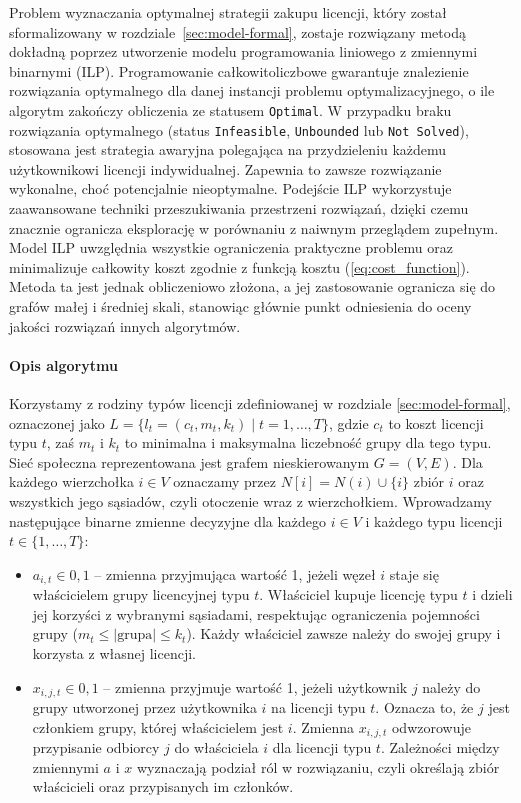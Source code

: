 Problem wyznaczania optymalnej strategii zakupu licencji, który został sformalizowany w rozdziale~\ref{sec:model-formal}, zostaje rozwiązany metodą dokładną poprzez utworzenie modelu programowania liniowego z zmiennymi binarnymi (ILP).
Programowanie całkowitoliczbowe gwarantuje znalezienie rozwiązania optymalnego dla danej instancji problemu optymalizacyjnego, o ile algorytm zakończy obliczenia ze statusem \texttt{Optimal}.
W przypadku braku rozwiązania optymalnego (status \texttt{Infeasible}, \texttt{Unbounded} lub \texttt{Not Solved}), stosowana jest strategia awaryjna polegająca na przydzieleniu każdemu użytkownikowi licencji indywidualnej. Zapewnia to zawsze rozwiązanie wykonalne, choć potencjalnie nieoptymalne.
Podejście ILP wykorzystuje zaawansowane techniki przeszukiwania przestrzeni rozwiązań, dzięki czemu znacznie ogranicza eksplorację w porównaniu z naiwnym przeglądem zupełnym.
Model ILP uwzględnia wszystkie ograniczenia praktyczne problemu oraz minimalizuje całkowity koszt zgodnie z funkcją kosztu (\ref{eq:cost_function}).
Metoda ta jest jednak obliczeniowo złożona, a jej zastosowanie ogranicza się do grafów małej i średniej skali, stanowiąc głównie punkt odniesienia do oceny jakości rozwiązań innych algorytmów.

\paragraph{Opis algorytmu}
Korzystamy z rodziny typów licencji zdefiniowanej w rozdziale \ref{sec:model-formal}, oznaczonej jako $L = \{{l_t = (c_t,m_t,k_t) \mid t = 1,\dots,T}\}$, gdzie $c_t$ to koszt licencji typu $t$, zaś $m_t$ i $k_t$ to minimalna i maksymalna liczebność grupy dla tego typu. Sieć społeczna reprezentowana jest grafem nieskierowanym $G = (V,E)$. Dla każdego wierzchołka $i \in V$ oznaczamy przez $N[i] = N(i) \cup \{i\}$ zbiór $i$ oraz wszystkich jego sąsiadów, czyli otoczenie wraz z wierzchołkiem. Wprowadzamy następujące binarne zmienne decyzyjne dla każdego $i \in V$ i każdego typu licencji $t \in \{1,\dots,T\}$:
\begin{itemize}\setlength{\itemsep}{1ex}
\item $a_{i,t} \in {0,1}$ -- zmienna przyjmująca wartość 1, jeżeli węzeł $i$ staje się właścicielem grupy licencyjnej typu $t$. Właściciel kupuje licencję typu $t$ i dzieli jej korzyści z wybranymi sąsiadami, respektując ograniczenia pojemności grupy ($m_t \leq |\text{grupa}| \leq k_t$). Każdy właściciel zawsze należy do swojej grupy i korzysta z własnej licencji.
\item $x_{i,j,t} \in {0,1}$ -- zmienna przyjmuje wartość 1, jeżeli użytkownik $j$ należy do grupy utworzonej przez użytkownika $i$ na licencji typu $t$. Oznacza to, że $j$ jest członkiem grupy, której właścicielem jest $i$. Zmienna $x_{i,j,t}$ odwzorowuje przypisanie odbiorcy $j$ do właściciela $i$ dla licencji typu $t$. Zależności między zmiennymi $a$ i $x$ wyznaczają podział ról w rozwiązaniu, czyli określają zbiór właścicieli oraz przypisanych im członków.
\end{itemize}


